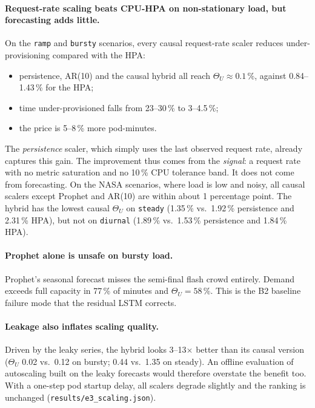 \documentclass[11pt,a4paper]{article}
\begin{document}
\paragraph{Request-rate scaling beats CPU-HPA on non-stationary load, but forecasting adds little.} On the
\texttt{ramp} and \texttt{bursty} scenarios, every causal request-rate scaler reduces under-provisioning
compared with the HPA:
\begin{itemize}
\item persistence, AR(10) and the causal hybrid all reach $\Theta_U\approx0.1$\,\%, against 0.84--1.43\,\% for
      the HPA;
\item time under-provisioned falls from 23--30\,\% to 3--4.5\,\%;
\item the price is 5--8\,\% more pod-minutes.
\end{itemize}
The \emph{persistence} scaler, which simply uses the last observed request rate, already captures this gain.
The improvement thus comes from the \emph{signal}: a request rate with no metric saturation and no 10\,\% CPU
tolerance band. It does not come from forecasting. On the NASA scenarios, where load is low and noisy, all
causal scalers except Prophet and AR(10) are within about 1 percentage point. The hybrid has the lowest causal
$\Theta_U$ on \texttt{steady} (1.35\,\% vs.\ 1.92\,\% persistence and 2.31\,\% HPA), but not on
\texttt{diurnal} (1.89\,\% vs.\ 1.53\,\% persistence and 1.84\,\% HPA).

\paragraph{Prophet alone is unsafe on bursty load.} Prophet's seasonal forecast misses the semi-final flash
crowd entirely. Demand exceeds full capacity in 77\,\% of minutes and $\Theta_U=58$\,\%. This is the B2 baseline
failure mode that the residual LSTM corrects.

\paragraph{Leakage also inflates scaling quality.} Driven by the leaky series, the hybrid looks 3--13$\times$
better than its causal version ($\Theta_U$ 0.02 vs.\ 0.12 on bursty; 0.44 vs.\ 1.35 on steady). An offline
evaluation of autoscaling built on the leaky forecasts would therefore overstate the benefit too. With a
one-step pod startup delay, all scalers degrade slightly and the ranking is unchanged (\texttt{results/e3\_scaling.json}).
\end{document}
